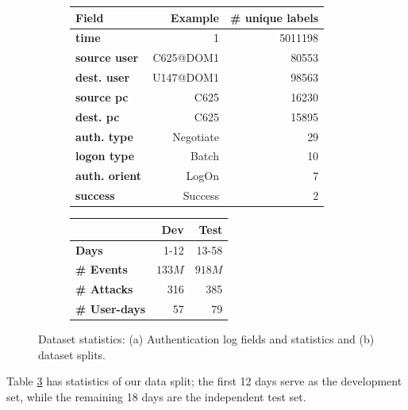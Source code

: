 \documentclass[letterpaper]{article} %
\begin{document}
\begin{figure}
\begin{subfigure}{0.47\textwidth}
\centering
    \begin{tabular}{|l|r|r|}\hline
         {\bf Field} & {\bf Example}  & {\bf \# unique labels} \\\hline
         {\bf time} & {1} & {5011198}  \\\hline
        {\bf source user} & {C625@DOM1}  & {80553}\\\hline
        {\bf dest. user} & {U147@DOM1} & {98563}  \\\hline
        {\bf source pc} & {C625}  & {16230} \\\hline
        {\bf dest. pc} & {C625}  & {15895} \\\hline
        {\bf auth. type} & {Negotiate} & {29} \\\hline
        {\bf logon type} & {Batch}  & {10} \\\hline
        {\bf auth. orient} & {LogOn}  & {7} \\\hline
        {\bf success} & {Success}  & {2} \\\hline
    \end{tabular}
    \caption{} \label{tab:auth}
\end{subfigure}
\begin{subfigure}{0.47\textwidth}
\centering
    \begin{tabular}{|l|r|r|}\hline
         {\bf } & {\bf Dev}  & {\bf Test} \\\hline
         {\bf Days} & {1-12} & {13-58}  \\\hline
        {\bf \# Events} & $133M$ & $918M$\\\hline
        {\bf \# Attacks} & 316 & 385  \\\hline
        {\bf \# User-days} & 57 & 79 \\\hline
    \end{tabular}
    \caption{} \label{tab:split}
\end{subfigure}
    \caption{Dataset statistics: (a) Authentication log fields and statistics and (b) dataset splits.}
\end{figure}


Table \ref{tab:split} has statistics of our data split; the first 12 days serve as the development set, while the remaining 18 days are the independent test set. 

\end{document}
